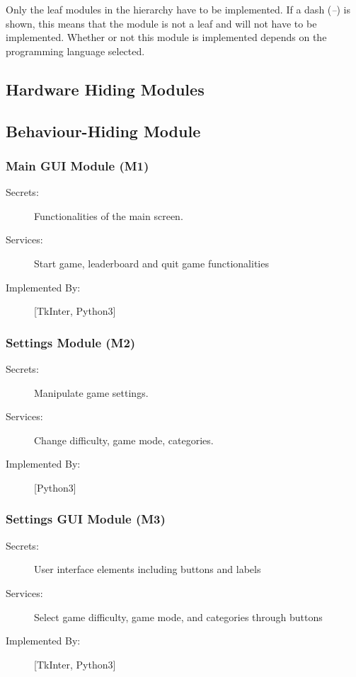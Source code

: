\documentclass[12pt, titlepage]{article}
\begin{document}
Only the leaf modules in the
hierarchy have to be implemented. If a dash (\emph{--}) is shown, this means
that the module is not a leaf and will not have to be implemented. Whether or
not this module is implemented depends on the programming language
selected.

\subsection{Hardware Hiding Modules}

\subsection{Behaviour-Hiding Module}

\subsubsection{Main GUI Module (M1)}

\begin{description}
\item[Secrets:]Functionalities of the main screen.
\item[Services:]Start game, leaderboard and quit game functionalities
\item[Implemented By:] [TkInter, Python3]
\end{description}

\subsubsection{Settings Module (M2)}

\begin{description}
\item[Secrets:]Manipulate game settings.
\item[Services:]Change difficulty, game mode, categories. 
\item[Implemented By:] [Python3]
\end{description}

\subsubsection{Settings GUI Module (M3)}

\begin{description}
\item[Secrets:]User interface elements including buttons and labels
\item[Services:]Select game difficulty, game mode, and categories through buttons
\item[Implemented By:] [TkInter, Python3]
\end{description}
\end{document}
